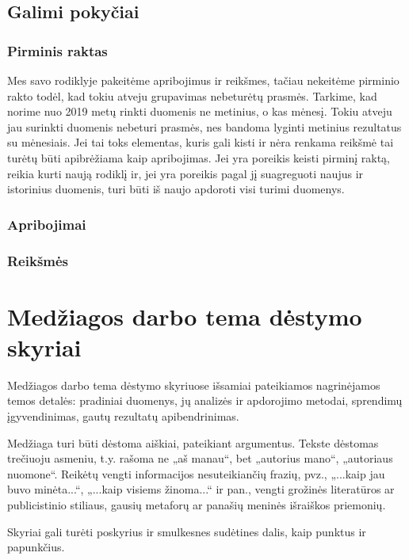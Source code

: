 \documentclass{VUMIFPSbakalaurinis}
\begin{document}
\subsection{Galimi pokyčiai}

\subsubsection{Pirminis raktas}
Mes savo rodiklyje pakeitėme apribojimus ir reikšmes, tačiau nekeitėme pirminio rakto todėl, kad tokiu atveju grupavimas nebeturėtų prasmės. Tarkime, kad norime nuo 2019 metų rinkti duomenis ne metinius, o kas mėnesį. Tokiu atveju jau surinkti duomenis nebeturi prasmės, nes bandoma lyginti metinius rezultatus su mėnesiais. Jei tai toks elementas, kuris gali kisti ir nėra renkama reikšmė tai turėtų būti apibrėžiama kaip apribojimas. Jei yra poreikis keisti pirminį raktą, reikia kurti naują rodiklį ir, jei yra poreikis pagal jį suagreguoti naujus ir istorinius duomenis, turi būti iš naujo apdoroti visi turimi duomenys.     

\subsubsection{Apribojimai}

\subsubsection{Reikšmės}


\section{Medžiagos darbo tema dėstymo skyriai}
Medžiagos darbo tema dėstymo skyriuose išsamiai pateikiamos nagrinėjamos temos
detalės: pradiniai duomenys, jų analizės ir apdorojimo metodai, sprendimų
įgyvendinimas, gautų rezultatų apibendrinimas.

Medžiaga turi būti dėstoma aiškiai, pateikiant argumentus. Tekste dėstomas
trečiuoju asmeniu, t.y. rašoma ne „aš manau“, bet „autorius mano“, „autoriaus
nuomone“. Reikėtų vengti informacijos nesuteikiančių frazių, pvz., „...kaip jau
buvo minėta...“, „...kaip visiems žinoma...“ ir pan., vengti grožinės
literatūros ar publicistinio stiliaus, gausių metaforų ar panašių meninės
išraiškos priemonių.

Skyriai gali turėti poskyrius ir smulkesnes sudėtines dalis, kaip punktus ir
papunkčius.

\end{document}
